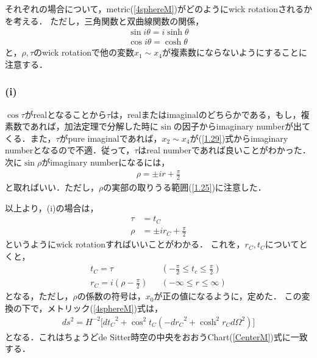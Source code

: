 それぞれの場合について，metric(\ref{4sphereM})がどのようにwick rotationされるかを考える．
ただし，三角関数と双曲線関数の関係，
\begin{eqnarray}
  \label{1.29}
  \sin{i\theta}=i\sinh{\theta} \\
  \label{1.30}
    \cos{i\theta}=\cosh{\theta}
\end{eqnarray}
と，$\rho,\tau$のwick rotationで他の変数$x_1\sim x_4$が複素数にならないようにすることに注意する．
\subsubsection{(i)}
$\cos\tau$がrealとなることから$\tau$は，realまたはimaginalのどちらかである，もし，複素数であれば，加法定理で分解した時に$\sin$の因子からimaginary numberが出てくる．また，$\tau$がpure imaginalであれば，$x_2\sim x_4$が(\ref{1.29})式からimaginary numberとなるので不適．従って，$\tau$はreal numberであれば良いことがわかった．次に$\sin\rho$がimaginary numberになるには，
\begin{eqnarray}
  \rho=\pm ir+\frac{\pi}{2}
\end{eqnarray}
と取ればいい．ただし，$\rho$の実部の取りうる範囲(\ref{1.25})に注意した．

以上より，(i)の場合は，
\begin{align}
  \tau&=t_{C} \\
  \rho &= \pm ir_{C} +\frac{\pi}{2}
\end{align}
というようにwick rotationすればいいことがわかる．
これを，$r_{C},t_{C}$についてとくと，
\begin{align}
  t_{C} = \tau& &(-\frac{\pi}{2} \leqslant t_{c} \leqslant \frac{\pi}{2}) \\
  r_{C} =i(\rho-\frac{\pi}{2})& &(-\infty \leqslant r \leqslant \infty)
\end{align}
となる，ただし，$\rho$の係数の符号は，$x_0$が正の値になるように，定めた．
この変換の下で，メトリック(\ref{4sphereM})式は，
\begin{align}
  ds^2=H^{-2}\biggl[{dt_{C}}^2+\cos^2t_{C}(-{dr_{C}}^2+\cosh^2r_{C}d\Omega^2) \biggr]
\end{align}
となる．これはちょうどde Sitter時空の中央をおおうChart(\ref{CenterM})式に一致する．
